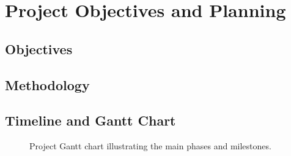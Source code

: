 \section{Project Objectives and Planning}

\lipsum[1]

\subsection{Objectives}

\lipsum[2]

\subsection{Methodology}

\lipsum[3]

\subsection{Timeline and Gantt Chart}

\begin{figure}[H]
	\centering
	\caption{Project Gantt chart illustrating the main phases and milestones.}
	\label{fig:gantt}
\end{figure}
